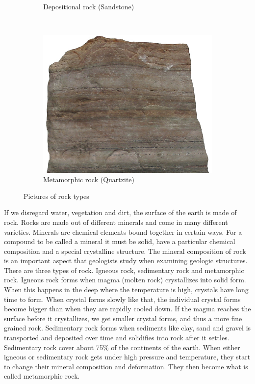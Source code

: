 \documentclass[a4paper,12pt]{report}
\begin{document}
\begin{figure}[]
\begin{subfigure}[b]{0.3\textwidth}
                \caption{Depositional rock (Sandstone)}
                \label{fig:tiger}
        \end{subfigure}
        ~ %
        \begin{subfigure}[b]{0.3\textwidth}
                \centering
                \includegraphics[width=\textwidth]{thesis/geo/quartzite.jpg}
                \caption{Metamorphic rock (Quartzite)}
                \label{fig:mouse}
        \end{subfigure}
        \caption{Pictures of rock types}\label{fig:rocks}
\end{figure}

If we disregard water, vegetation and dirt, the surface of the earth is made of rock. Rocks are made out of different minerals and come in many different varieties. Minerals are chemical elements bound together in certain ways. For a compound to be called a mineral it must be solid, have a particular chemical composition and a special crystalline structure. The mineral composition of rock is an important aspect that geologists study when examining geologic structures. There are three types of rock. Igneous rock, sedimentary rock and metamorphic rock. Igneous rock forms when magma (molten rock) crystallizes into solid form. When this happens in the deep where the temperature is high, crystals have long time to form. When crystal forms slowly like that, the individual crystal forms become bigger than when they are rapidly cooled down. If the magma reaches the surface before it crystallizes, we get smaller crystal forms, and thus a more fine grained rock. Sedimentary rock forms when sediments like clay, sand 
and gravel is transported and deposited over time and solidifies into rock after it settles. Sedimentary rock cover about 75\% of the continents of the earth. When either igneous or sedimentary rock gets under high pressure and temperature, they start to change their mineral composition and deformation. They then become what is called metamorphic rock.
\end{document}
